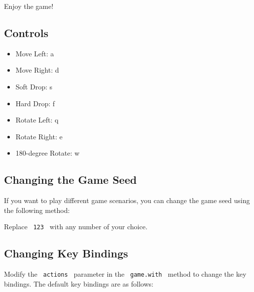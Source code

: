 Enjoy the game!

\subsection{Controls}\label{controls}

\begin{itemize}
\tightlist
\item
  Move Left: a
\item
  Move Right: d
\item
  Soft Drop: s
\item
  Hard Drop: f
\item
  Rotate Left: q
\item
  Rotate Right: e
\item
  180-degree Rotate: w
\end{itemize}

\subsection{Changing the Game Seed}\label{changing-the-game-seed}

If you want to play different game scenarios, you can change the game
seed using the following method:

\begin{Shaded}
\begin{Highlighting}[]
\end{Highlighting}
\end{Shaded}

Replace \texttt{\ 123\ } with any number of your choice.

\subsection{Changing Key Bindings}\label{changing-key-bindings}

Modify the \texttt{\ actions\ } parameter in the \texttt{\ game.with\ }
method to change the key bindings. The default key bindings are as
follows:

\begin{Shaded}
\begin{Highlighting}[]
\NormalTok{))}
\end{Highlighting}
\end{Shaded}

